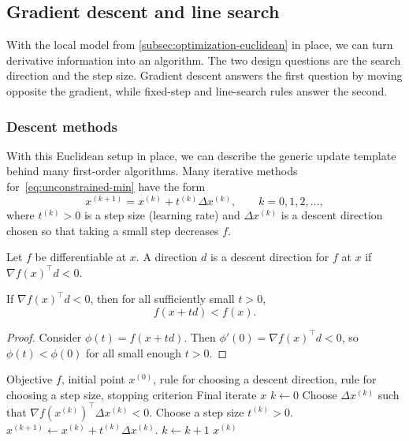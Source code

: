 \subsection{Gradient descent and line search}
\label{subsec:gradient-descent-line-search}

With the local model from \cref{subsec:optimization-euclidean} in place, we can turn derivative information into an algorithm.
The two design questions are the search direction and the step size.
Gradient descent answers the first question by moving opposite the gradient, while fixed-step and line-search rules answer the second.

\subsubsection{Descent methods}
\label{subsec:descent-methods}

With this Euclidean setup in place, we can describe the generic update template behind many first-order algorithms.
Many iterative methods for~\eqref{eq:unconstrained-min} have the form
\begin{equation}
  x^{(k+1)} = x^{(k)} + t^{(k)} \Delta x^{(k)},
  \qquad k = 0,1,2,\dots,
  \label{eq:generic-descent}
\end{equation}
where $t^{(k)} > 0$ is a step size (learning rate) and $\Delta x^{(k)}$ is a descent direction chosen so that taking a small step decreases $f$.

\begin{definition}
Let $f$ be differentiable at $x$.
A direction $d$ is a descent direction for $f$ at $x$ if $\nabla f(x)^\top d < 0$.
\end{definition}

\begin{lemma}
If $\nabla f(x)^\top d < 0$, then for all sufficiently small $t>0$,
\[
f(x+td) < f(x).
\]
\end{lemma}
\begin{proof}
Consider $\phi(t) = f(x+td)$.
Then $\phi'(0)=\nabla f(x)^\top d < 0$, so $\phi(t) < \phi(0)$ for all small enough $t>0$.
\end{proof}

\begin{algorithm}
  \caption{Generic descent method}
  \label{alg:generic-descent}
  \begin{algorithmic}[1]
    \Require Objective $f$, initial point $x^{(0)}$, rule for choosing a descent direction, rule for choosing a step size, stopping criterion
    \Ensure Final iterate $x$
    \State $k \gets 0$
      \State Choose $\Delta x^{(k)}$ such that $\nabla f(x^{(k)})^\top \Delta x^{(k)} < 0$.
      \State Choose a step size $t^{(k)} > 0$.
      \State $x^{(k+1)} \gets x^{(k)} + t^{(k)}\Delta x^{(k)}$.
      \State $k \gets k + 1$
    \EndWhile
    \State \Return $x^{(k)}$
  \end{algorithmic}
\end{algorithm}

